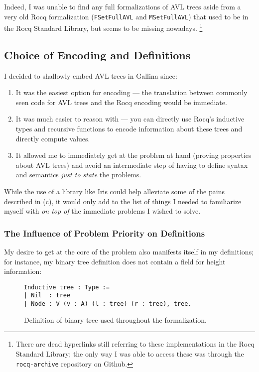 \documentclass[acmsmall, authorversion, nonacm, overload]{acmart}
\begin{document}
Indeed, I was unable to find any full formalizations of AVL trees aside from
a very old Rocq formalization (\verb|FSetFullAVL| and \verb|MSetFullAVL|)
that used to be in the Rocq Standard Library, but seems to be missing nowadays.
\footnote{
There are dead hyperlinks still referring to these implementations in the Rocq Standard Library;
the only way I was able to access these was through the \texttt{rocq-archive} repository on Github.
}

\subsection{Choice of Encoding and Definitions}
I decided to shallowly embed AVL trees in Gallina since:
\begin{enumerate}[label=(\alph*)]
\item It was the easiest option for encoding --- the translation between
  commonly seen code for AVL trees and the Rocq encoding would be immediate.
\item It was much easier to reason with --- you can directly use Rocq's inductive types and recursive functions
  to encode information about these trees and directly compute values.
\item It allowed me to immediately get at the problem at hand (proving properties about AVL trees)
  and avoid an intermediate step of having to define syntax and semantics \emph{just to state} the problems.
\end{enumerate}
While the use of a library like Iris could help alleviate some of the pains described in (c),
it would only add to the list of things I needed to familiarize myself with \emph{on top of}
the immediate problems I wished to solve.

\subsubsection{The Influence of Problem Priority on Definitions}
My desire to get at the core of the problem also manifests itself in my definitions; for instance,
my binary tree definition does not contain a field for height information:
\begin{figure}[h!]
\begin{verbatim}
Inductive tree : Type :=
| Nil  : tree
| Node : ∀ (v : A) (l : tree) (r : tree), tree.
\end{verbatim}
  \caption{Definition of binary tree used throughout the formalization.}%
  \label{fig:tree_def}
\end{figure}
\end{document}
